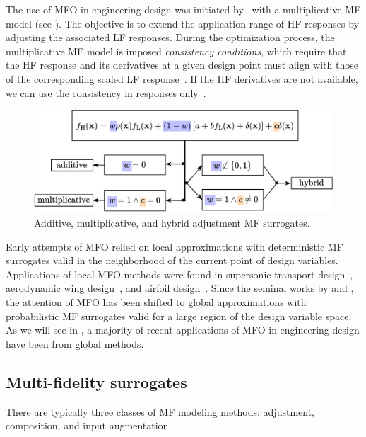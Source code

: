 \documentclass[iicol,sn-basic]{sn-jnl}%
\begin{document}
The use of MFO in engineering design was initiated by~\cite{Haftka1991} with a multiplicative MF model (see ).
The objective is to extend the application range of HF responses by adjusting the associated LF responses.
During the optimization process, the multiplicative MF model is imposed \textit{consistency conditions}, which require that the HF response and its derivatives at a given design point must align with those of the corresponding scaled LF response~\citep{Alexandrov2001}.
If the HF derivatives are not available, we can use the consistency in responses only~\citep{Rodriguez2001}.

\begin{figure}
	\centering
	\includegraphics[scale=0.9]{Fig2.png}
	\caption{Additive, multiplicative, and hybrid adjustment MF surrogates.}
	\label{Fig2}
\end{figure}

Early attempts of MFO relied on local approximations with deterministic MF surrogates valid in the neighborhood of the current point of design variables.
Applications of local MFO methods were found in supersonic transport design~\citep{Knill1999}, aerodynamic wing design~\citep{Alexandrov2001}, and airfoil design~\citep{Gano2005}.
Since the seminal works by \cite{Huang2006smo} and \cite{Forrester2007}, the attention of MFO has been shifted to global approximations with probabilistic MF surrogates valid for a large region of the design variable space.
As we will see in , a majority of recent applications of MFO in engineering design have been from global methods.

\subsection{Multi-fidelity surrogates}\label{Sec22}

There are typically three classes of MF modeling methods:
adjustment, composition, and input augmentation.
\end{document}
